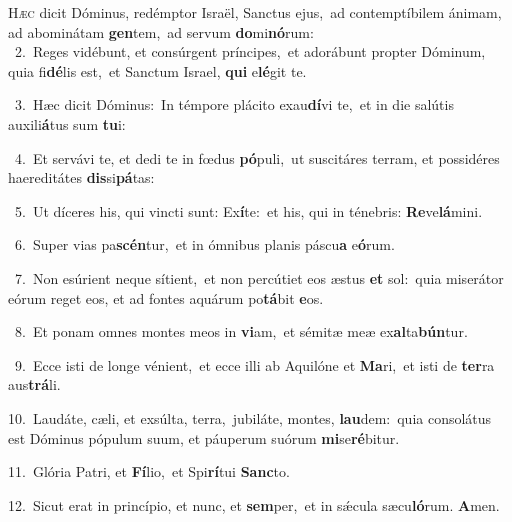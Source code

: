 \lettrine{\initial\textcolor{\initialcolor}{H}}{æc} dicit Dóminus, redémptor Israël, Sanctus ejus,~\dagger ad contemptíbilem ánimam, ad abominátam \textbf{gen}\-tem,~\star ad servum \textbf{do}\-mi\-\textbf{nó}\-rum:\\
{\numbfont\textcolor{\numbcolor}{~2.}}~Reges vidébunt, et consúrgent príncipes,~\dagger et adorábunt propter Dóminum, quia fi\-\textbf{dé}\-lis est,~\star et Sanctum Israel, \textbf{qui} e\-\textbf{lé}\-git te.\par
{\numbfont\textcolor{\numbcolor}{~3.}}~Hæc dicit Dóminus:~\dagger In témpore plácito exau\-\textbf{dí}\-vi te,~\star et in die salútis auxili\-\textbf{á}\-tus sum \textbf{tu}\-i:\par
{\numbfont\textcolor{\numbcolor}{~4.}}~Et servávi te, et dedi te in fœdus \textbf{pó}\-puli,~\star ut suscitáres terram, et possidéres haereditátes \textbf{dis}\-si\-\textbf{pá}\-tas:\par
{\numbfont\textcolor{\numbcolor}{~5.}}~Ut díceres his, qui vincti sunt: Ex\-\textbf{í}\-te:~\star et his, qui in ténebris: \textbf{Re}\-ve\-\textbf{lá}\-mini.\par
{\numbfont\textcolor{\numbcolor}{~6.}}~Super vias pa\-\textbf{scén}\-tur,~\star et in ómnibus planis páscu\textbf{a} e\-\textbf{ó}\-rum.\par
{\numbfont\textcolor{\numbcolor}{~7.}}~Non esúrient neque sítient,~\dagger et non percútiet eos æstus \textbf{et} sol:~\star quia miserátor eórum reget eos, et ad fontes aquárum po\-\textbf{tá}\-bit \textbf{e}\-os.\par
{\numbfont\textcolor{\numbcolor}{~8.}}~Et ponam omnes montes meos in \textbf{vi}\-am,~\star et sémitæ meæ ex\-\textbf{al}\-ta\-\textbf{bún}\-tur.\par
{\numbfont\textcolor{\numbcolor}{~9.}}~Ecce isti de longe vénient,~\dagger et ecce illi ab Aquilóne et \textbf{Ma}\-ri,~\star et isti de \textbf{ter}\-ra aus\-\textbf{trá}\-li.\par
{\numbfont\textcolor{\numbcolor}{10.}}~Laudáte, cæli, et exsúlta, terra,~\dagger jubiláte, montes, \textbf{lau}\-dem:~\star quia consolátus est Dóminus pópulum suum, et páuperum suórum \textbf{mi}\-se\-\textbf{ré}\-bitur.\par
{\numbfont\textcolor{\numbcolor}{11.}}~Glória Patri, et \textbf{Fí}\-lio,~\star et Spi\-\textbf{rí}\-tui \textbf{Sanc}\-to.\par
{\numbfont\textcolor{\numbcolor}{12.}}~Sicut erat in princípio, et nunc, et \textbf{sem}\-per,~\star et in sǽcula sæcu\-\textbf{ló}\-rum. \textbf{A}\-men.\par
